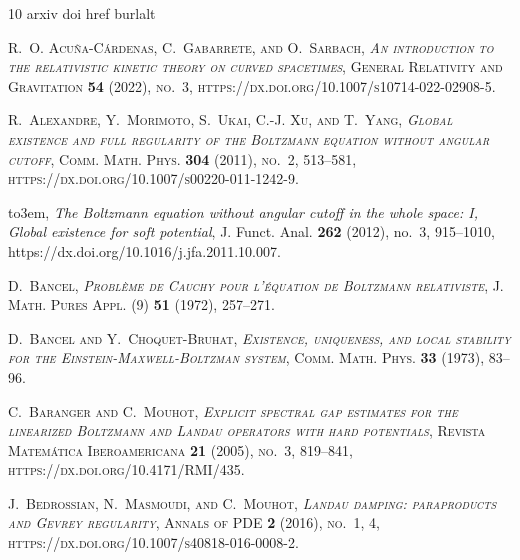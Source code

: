 \documentclass[reqno]{amsart}
\theoremstyle{definition}
\numberwithin{equation}{section}
\numberwithin{theorem}{section}
\begin{document}
\providecommand{\bysame}{\leavevmode\hbox to3em{\hrulefill}\thinspace}
\providecommand{\href}[2]{#2}
\begin{thebibliography}{10}
\expandafter\ifx\csname arxiv\endcsname\relax
  \def\arxiv#1{\burlalt{https://arxiv.org/abs/#1}{https://arxiv.org/abs/#1}}\fi
\expandafter\ifx\csname doi\endcsname\relax
  \def\doi#1{\burlalt{https://dx.doi.org/#1}{https://dx.doi.org/#1}}\fi
\expandafter\ifx\csname href\endcsname\relax
  \def\href#1#2{#2}\fi
\expandafter\ifx\csname burlalt\endcsname\relax
  \def\burlalt#1#2{\href{#2}{#1}}\fi

\bgroup\scshape{}R.~O. Acu{\~n}a-C{\'a}rdenas\egroup{}, \bgroup\scshape{}C.~Gabarrete\egroup{}, and \bgroup\scshape{}O.~Sarbach\egroup{}, \emph{An introduction to the relativistic kinetic theory on curved spacetimes}, General Relativity and Gravitation \textbf{54} (2022), no.~3, \doi{10.1007/s10714-022-02908-5}.

\bgroup\scshape{}R.~Alexandre\egroup{}, \bgroup\scshape{}Y.~Morimoto\egroup{}, \bgroup\scshape{}S.~Ukai\egroup{}, \bgroup\scshape{}C.-J. Xu\egroup{}, and \bgroup\scshape{}T.~Yang\egroup{}, \emph{Global existence and full regularity of the {B}oltzmann equation without angular cutoff}, Comm. Math. Phys. \textbf{304} (2011), no.~2, 513--581, \doi{10.1007/s00220-011-1242-9}.

\bysame, \emph{The {B}oltzmann equation without angular cutoff in the whole space: {I}, {G}lobal existence for soft potential}, J. Funct. Anal. \textbf{262} (2012), no.~3, 915--1010, \doi{10.1016/j.jfa.2011.10.007}.

\bgroup\scshape{}D.~Bancel\egroup{}, \emph{Probl\`eme de {C}auchy pour l'\'{e}quation de {B}oltzmann relativiste}, J. Math. Pures Appl. (9) \textbf{51} (1972), 257--271.

\bgroup\scshape{}D.~Bancel\egroup{} and \bgroup\scshape{}Y.~Choquet-Bruhat\egroup{}, \emph{Existence, uniqueness, and local stability for the {E}instein-{M}axwell-{B}oltzman system}, Comm. Math. Phys. \textbf{33} (1973), 83--96.

\bgroup\scshape{}C.~Baranger\egroup{} and \bgroup\scshape{}C.~Mouhot\egroup{}, \emph{Explicit spectral gap estimates for the linearized {B}oltzmann and {L}andau operators with hard potentials}, Revista Matem{\'a}tica Iberoamericana \textbf{21} (2005), no.~3, 819--841, \doi{10.4171/RMI/435}.

\bgroup\scshape{}J.~Bedrossian\egroup{}, \bgroup\scshape{}N.~Masmoudi\egroup{}, and \bgroup\scshape{}C.~Mouhot\egroup{}, \emph{Landau damping: paraproducts and {G}evrey regularity}, Annals of PDE \textbf{2} (2016), no.~1, 4, \doi{10.1007/s40818-016-0008-2}.


\end{thebibliography}
\end{document}
